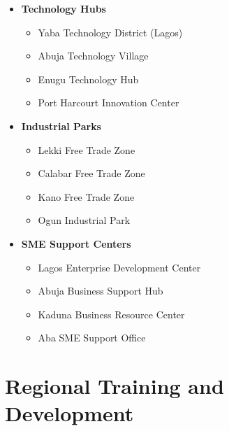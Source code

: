 \begin{tcolorbox}[
    colback=white,
    colframe=primarydark,
    title=\textbf{Business Support Resources},
    before skip=1em,
    after skip=1em
]
    \begin{itemize}[leftmargin=*,itemsep=0.5em]
        \item \textbf{Technology Hubs}
        \begin{itemize}[itemsep=0.3em]
            \item Yaba Technology District (Lagos)
            \item Abuja Technology Village
            \item Enugu Technology Hub
            \item Port Harcourt Innovation Center
        \end{itemize}

        \vspace{0.5em}

        \item \textbf{Industrial Parks}
        \begin{itemize}[itemsep=0.3em]
            \item Lekki Free Trade Zone
            \item Calabar Free Trade Zone
            \item Kano Free Trade Zone
            \item Ogun Industrial Park
        \end{itemize}

        \vspace{0.5em}

        \item \textbf{SME Support Centers}
        \begin{itemize}[itemsep=0.3em]
            \item Lagos Enterprise Development Center
            \item Abuja Business Support Hub
            \item Kaduna Business Resource Center
            \item Aba SME Support Office
        \end{itemize}
    \end{itemize}
\end{tcolorbox}


\section{Regional Training and Development}\label{sec:training-development}
\vspace{1em}

